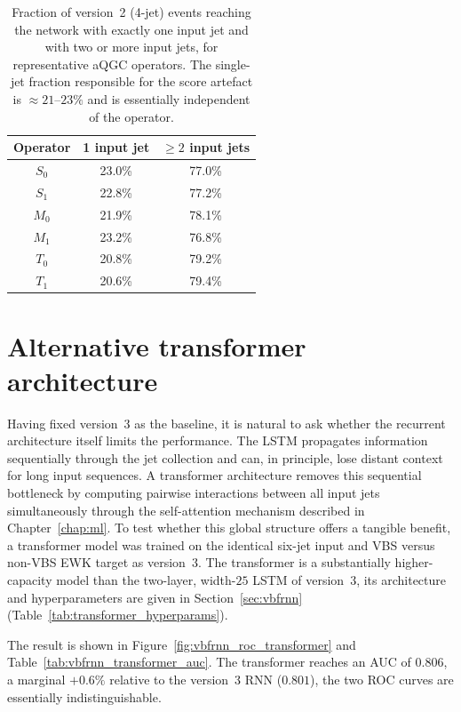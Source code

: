 \begin{table}[htbp]
  \centering
  \caption{Fraction of version~2 (4-jet) events reaching the network with exactly one input jet and with two or more input jets, for representative aQGC operators. The single-jet fraction responsible for the score artefact is $\approx\!21$--$23\%$ and is essentially independent of the operator.}
  \label{tab:vbfrnn_njets_frac}
  \begin{tabular}{|c|c|c|}
    \hline
    \textbf{Operator} & \textbf{1 input jet} & \textbf{$\geq 2$ input jets} \\
    \hline
    $S_0$ & 23.0\% & 77.0\% \\
    $S_1$ & 22.8\% & 77.2\% \\
    $M_0$ & 21.9\% & 78.1\% \\
    $M_1$ & 23.2\% & 76.8\% \\
    $T_0$ & 20.8\% & 79.2\% \\
    $T_1$ & 20.6\% & 79.4\% \\
    \hline
  \end{tabular}
\end{table}


\section{Alternative transformer architecture}
\label{sec:vbfrnn_transformer}

Having fixed version~3 as the baseline, it is natural to ask whether the recurrent architecture itself limits the performance. The LSTM propagates information sequentially through the jet collection and can, in principle, lose distant context for long input sequences. A transformer architecture removes this sequential bottleneck by computing pairwise interactions between all input jets simultaneously through the self-attention mechanism described in Chapter~\ref{chap:ml}. To test whether this global structure offers a tangible benefit, a transformer model was trained on the identical six-jet input and VBS versus non-VBS EWK target as version~3. The transformer is a substantially higher-capacity model than the two-layer, width-$25$ LSTM of version~3, its architecture and hyperparameters are given in Section~\ref{sec:vbfrnn} (Table~\ref{tab:transformer_hyperparams}).

The result is shown in Figure~\ref{fig:vbfrnn_roc_transformer} and Table~\ref{tab:vbfrnn_transformer_auc}. The transformer reaches an AUC of $0.806$, a marginal $+0.6\%$ relative to the version~3 RNN ($0.801$), the two ROC curves are essentially indistinguishable.

